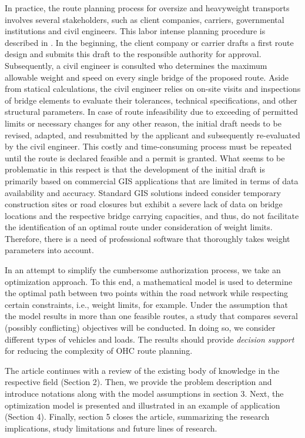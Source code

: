 \par In practice, the route planning process for oversize and heavyweight transports involves several stakeholders, such as client companies, carriers, governmental institutions and civil engineers.
This labor intense planning procedure is described in \cite{Osegueda.1999}. In the beginning, the client company or carrier drafts a first route design and submits this draft to the responsible authority for approval.
Subsequently, a civil engineer is consulted who determines the maximum allowable weight and speed on every single bridge of the proposed route.
Aside from statical calculations, the civil engineer relies on on-site visits and inspections of bridge elements to evaluate their tolerances, technical specifications, and other structural parameters.
In case of route infeasibility due to exceeding of permitted limits or necessary changes for any other reason, the initial draft needs to be revised, adapted, and resubmitted by the applicant and subsequently re-evaluated by the civil engineer.
This costly and time-consuming process must be repeated until the route is declared feasible and a permit is granted.
What seems to be problematic in this respect is that the development of the initial draft is primarily based on commercial GIS applications that are limited in terms of data availability and accuracy.
Standard GIS solutions indeed consider temporary construction sites or road closures but exhibit a severe lack of data on bridge locations and the respective bridge carrying capacities, and thus, do not facilitate the identification of an optimal route under consideration of weight limits.
Therefore, there is a need of professional software that thoroughly takes weight parameters into account.
\par In an attempt to simplify the cumbersome authorization process, we take an optimization approach.
To this end, a mathematical model is used to determine the optimal path between two points within the road network while respecting certain constraints, i.e., weight limits, for example.
Under the assumption that the model results in more than one feasible routes, a study that compares several (possibly conflicting) objectives will be conducted.
In doing so, we consider different types of vehicles and loads. The results should provide \textit{decision support} for reducing the complexity of OHC route planning. 
\par
The article continues with a review of the existing body of knowledge in the respective field (Section 2).
Then, we provide the problem description and introduce notations along with the model assumptions in section 3. Next, the optimization model is presented and illustrated in an example of application (Section 4).
Finally, section 5 closes the article, summarizing the research implications, study limitations and future lines of research.
